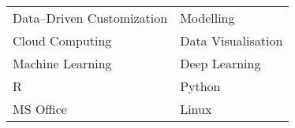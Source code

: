 \begin{center}
    \begin{tabular}{ m{5cm} m{5cm} }
        Data--Driven Customization & Modelling          \\
        Cloud Computing            & Data Visualisation \\
        Machine Learning           & Deep Learning      \\
        R                          & Python             \\
        MS Office                  & Linux
    \end{tabular}
\end{center}